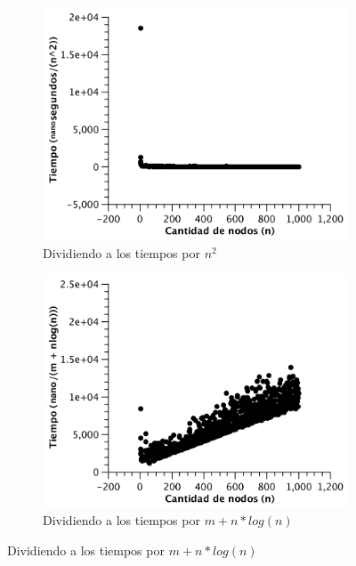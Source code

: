\begin{figure}[H]
        \centering
        \begin{subfigure}[b]{0.45\textwidth}
                \includegraphics[width=\textwidth]{imagenes/completo-matriz-3.pdf}
                \caption{Dividiendo a los tiempos por $n^2$}
        \end{subfigure}
        \begin{subfigure}[b]{0.45\textwidth}
                \includegraphics[width=\textwidth]{imagenes/completo-matriz-4.pdf}
                \caption{Dividiendo a los tiempos por $m + n*log(n)$}
        \end{subfigure}
\end{figure}

